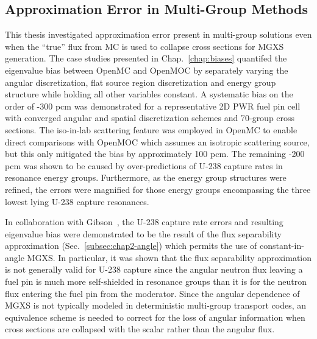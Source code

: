 \subsection{Approximation Error in Multi-Group Methods}
\label{subsec:chap12-approx-error}

This thesis investigated approximation error present in multi-group solutions even when the ``true'' flux from \ac{MC} is used to collapse cross sections for \ac{MGXS} generation. The case studies presented in Chap.~\ref{chap:biases} quantifed the eigenvalue bias between OpenMC and OpenMOC by separately varying the angular discretization, flat source region discretization and energy group structure while holding all other variables constant. A systematic bias on the order of -300 \ac{pcm} was demonstrated for a representative 2D \ac{PWR} fuel pin cell with converged angular and spatial discretization schemes and 70-group cross sections. The iso-in-lab scattering feature was employed in OpenMC to enable direct comparisons with OpenMOC which assumes an isotropic scattering source, but this only mitigated the bias by approximately 100 \ac{pcm}. The remaining -200 \ac{pcm} was shown to be caused by over-predictions of U-238 capture rates in resonance energy groups. Furthermore, as the energy group structures were refined, the errors were magnified for those energy groups encompassing the three lowest lying U-238 capture resonances.


In collaboration with Gibson~\cite{gibson2016thesis}, the U-238 capture rate errors and resulting eigenvalue bias were demonstrated to be the result of the flux separability approximation (Sec.~\ref{subsec:chap2-angle}) which permits the use of constant-in-angle \ac{MGXS}. In particular, it was shown that the flux separability approximation is not generally valid for U-238 capture since the angular neutron flux leaving a fuel pin is much more self-shielded in resonance groups than it is for the neutron flux entering the fuel pin from the moderator. Since the angular dependence of \ac{MGXS} is not typically modeled in deterministic multi-group transport codes, an equivalence scheme is needed to correct for the loss of angular information when cross sections are collapsed with the scalar rather than the angular flux. 

